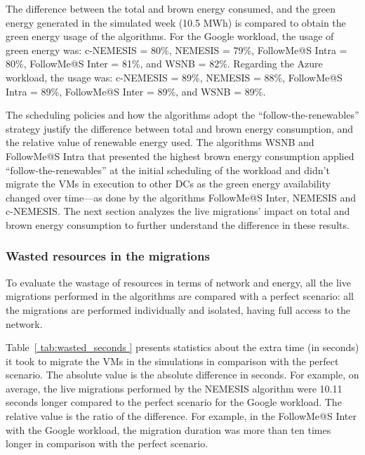 The difference between the total and brown energy consumed, and the green energy generated in the simulated week (10.5 MWh) is compared to obtain the green energy usage of the algorithms. For the Google workload, the usage of green energy was: c-NEMESIS = 80\%, NEMESIS = 79\%, FollowMe@S Intra = 80\%, FollowMe@S Inter = 81\%, and WSNB = 82\%. Regarding the Azure workload, the usage was: c-NEMESIS = 89\%, NEMESIS = 88\%, FollowMe@S Intra = 89\%, FollowMe@S Inter = 89\%, and WSNB = 89\%. 


The scheduling policies and how the algorithms adopt the ``follow-the-renewables'' strategy justify the difference between total and brown energy consumption, and the relative value of renewable energy used. The algorithms WSNB and FollowMe@S Intra that presented the highest brown energy consumption applied ``follow-the-renewables'' at the initial scheduling of the workload and didn't migrate the VMs in execution to other DCs as the green energy availability changed over time---as done by the algorithms FollowMe@S Inter, NEMESIS and c-NEMESIS. The next section analyzes the live migrations' impact on total and brown energy consumption to further understand the difference in these results.


\subsubsection{Wasted resources in the migrations}
\label{sec:wasted_resources_smartgreens}
To evaluate the wastage of resources in terms of network and energy, all the live migrations performed in the algorithms are compared with a perfect scenario: all the migrations are performed individually and isolated, having full access to the network.

Table~\ref{ tab:wasted_seconds } presents statistics about the extra time (in seconds) it took to migrate the VMs in the simulations in comparison with the perfect scenario. The absolute value is the absolute difference in seconds. For example, on average, the live migrations performed by the NEMESIS algorithm were 10.11 seconds longer compared to the perfect scenario for the Google workload. The relative value is the ratio of the difference. For example, in the FollowMe@S Inter with the Google workload, the migration duration was more than ten times longer in comparison with the perfect scenario.


